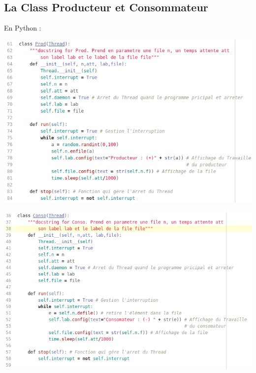 \documentclass{article}
\begin{document}
\subsection{La Class Producteur et Consommateur}

En Python :
\begin{center}
  \includegraphics[scale=0.6]{Prodpy.png}
\end{center}
\begin{center}
  \includegraphics[scale=0.6]{Consopy.png}
\end{center}
\end{document}
